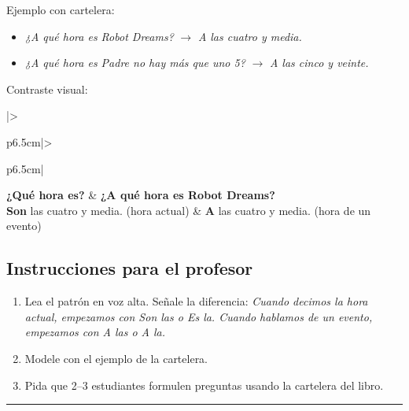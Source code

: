 \documentclass[a4paper,11pt]{article}
\begin{document}
\vspace{0.3cm}

Ejemplo con cartelera:
\begin{itemize}[leftmargin=2cm, itemsep=3pt]
\item \textit{¿A qué hora es Robot Dreams?} $\rightarrow$ \textit{A las cuatro y media.}
\item \textit{¿A qué hora es Padre no hay más que uno 5?} $\rightarrow$ \textit{A las cinco y veinte.}
\end{itemize}

\vspace{0.3cm}

Contraste visual:

\begin{center}
\renewcommand{\arraystretch}{1.5}
\begin{tabular}{|>{\raggedright\arraybackslash}p{6.5cm}|>{\raggedright\arraybackslash}p{6.5cm}|}
\hline
{}
\textbf{¿Qué hora es?} & \textbf{¿A qué hora es Robot Dreams?} \\
\hline
\textbf{Son} las cuatro y media. (hora actual) & \textbf{A} las cuatro y media. (hora de un evento) \\
\hline
\end{tabular}
\end{center}

\vspace{0.5cm}

\subsection*{Instrucciones para el profesor}

\begin{enumerate}[leftmargin=1.5cm, itemsep=4pt]
\item Lea el patrón en voz alta. Señale la diferencia: \textit{Cuando decimos la hora actual, empezamos con Son las o Es la. Cuando hablamos de un evento, empezamos con A las o A la.}
\item Modele con el ejemplo de la cartelera.
\item Pida que 2--3 estudiantes formulen preguntas usando la cartelera del libro.
\end{enumerate}

\newpage


\noindent\textcolor{violeta}{\rule{\linewidth}{2.5pt}}
\end{document}

